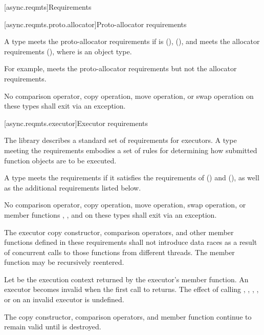 


[async.reqmts]{Requirements}


[async.reqmts.proto.allocator]{Proto-allocator requirements}

\pnum
A type  meets the proto-allocator requirements if  is  (),  (), and  meets the allocator requirements (), where  is an object type. \begin{note} For example,  meets the proto-allocator requirements but not the allocator requirements. \end{note} No comparison operator, copy operation, move operation, or swap operation on these types shall exit via an exception.



[async.reqmts.executor]{Executor requirements}

\pnum
The library describes a standard set of requirements for executors. A type meeting the  requirements embodies a set of rules for determining how submitted function objects are to be executed.

\pnum
A type  meets the  requirements if it satisfies the requirements of  () and  (), as well as the additional requirements listed below.

\pnum
No comparison operator, copy operation, move operation, swap operation, or member functions , , and  on these types shall exit via an exception.

\pnum
 The executor copy constructor, comparison operators, and other member functions defined in these requirements shall not introduce data races as a result of concurrent calls to those functions from different threads.
The member function  may be recursively reentered.

\pnum
Let  be the execution context returned by the executor's  member function. An executor becomes invalid when the first call to  returns. The effect of calling , , , , or  on an invalid executor is undefined. \begin{note} The copy constructor, comparison operators, and  member function continue to remain valid until  is destroyed. \end{note}

